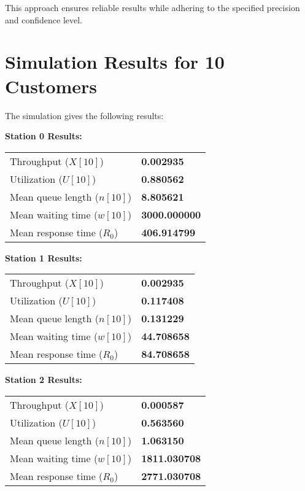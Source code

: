 \documentclass[12pt]{article}
\begin{document}
	This approach ensures reliable results while adhering to the specified precision and confidence level.
	\newpage
	\section*{Simulation Results for 10 Customers}
	The simulation gives the following results:
	
	\noindent\textbf{Station 0 Results:}
	\begin{table}[h!]
		\centering
		\begin{tabular}{@{}l l@{}}
			\toprule
			Throughput ($X[10]$)              & \textbf{0.002935} \\
			Utilization ($U[10]$)             & \textbf{0.880562} \\
			Mean queue length ($n[10]$)       & \textbf{8.805621} \\
			Mean waiting time ($w[10]$)       & \textbf{3000.000000} \\
			Mean response time ($R_0$)        & \textbf{406.914799} \\
			\bottomrule
		\end{tabular}
	\end{table}
	
	\noindent\textbf{Station 1 Results:}
	\begin{table}[h!]
		\centering
		\begin{tabular}{@{}l l@{}}
			\toprule
			Throughput ($X[10]$)              & \textbf{0.002935} \\
			Utilization ($U[10]$)             & \textbf{0.117408} \\
			Mean queue length ($n[10]$)       & \textbf{0.131229} \\
			Mean waiting time ($w[10]$)       & \textbf{44.708658} \\
			Mean response time ($R_0$)        & \textbf{84.708658} \\
			\bottomrule
		\end{tabular}
	\end{table}
	
	\noindent\textbf{Station 2 Results:}
	\begin{table}[h!]
		\centering
		\begin{tabular}{@{}l l@{}}
			\toprule
			Throughput ($X[10]$)              & \textbf{0.000587} \\
			Utilization ($U[10]$)             & \textbf{0.563560} \\
			Mean queue length ($n[10]$)       & \textbf{1.063150} \\
			Mean waiting time ($w[10]$)       & \textbf{1811.030708} \\
			Mean response time ($R_0$)        & \textbf{2771.030708} \\
			\bottomrule
		\end{tabular}
	\end{table}
	
\end{document}

